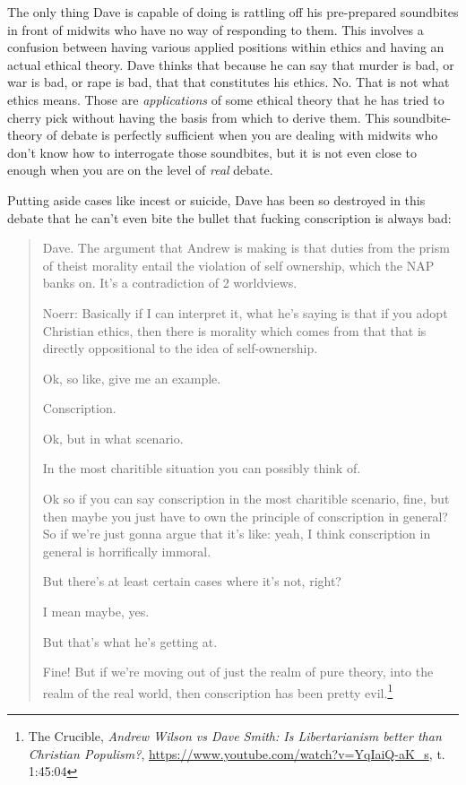 \documentclass[11pt]{article}
\begin{document}
The only thing Dave is capable of doing is rattling off his pre-prepared soundbites in front of midwits who have no way of responding to them. This involves a confusion between having various applied positions within ethics and having an actual ethical theory. Dave thinks that because he can say that murder is bad, or war is bad, or rape is bad, that that constitutes his ethics. No. That is not what ethics means. Those are \emph{applications} of some ethical theory that he has tried to cherry pick without having the basis from which to derive them. This soundbite-theory of debate is perfectly sufficient when you are dealing with midwits who don't know how to interrogate those soundbites, but it is not even close to enough when you are on the level of \emph{real} debate.

Putting aside cases like incest or suicide, Dave has been so destroyed in this debate that he can't even bite the bullet that fucking conscription is always bad:
\begin{quote}
Dave. The argument that Andrew is making is that duties from the prism of theist morality entail the violation of self ownership, which the NAP banks on. It's a contradiction of 2 worldviews.

Noerr: Basically if I can interpret it, what he's saying is that if you adopt Christian ethics, then there is morality which comes from that that is directly oppositional to the idea of self-ownership.

Ok, so like, give me an example.

Conscription.

Ok, but in what scenario.

In the most charitible situation you can possibly think of.

Ok so if you can say conscription in the most charitible scenario, fine, but then maybe you just have to own the principle of conscription in general? So if we're just gonna argue that it's like: yeah, I think conscription in general is horrifically immoral.

But there's at least certain cases where it's not, right?

I mean maybe, yes.

But that's what he's getting at.

Fine! But if we're moving out of just the realm of pure theory, into the realm of the real world, then conscription has been pretty evil.\footnote{The Crucible, \emph{Andrew Wilson vs Dave Smith: Is Libertarianism better than Christian Populism?}, \url{https://www.youtube.com/watch?v=YqIaiQ-aK\_s}, t. 1:45:04}
\end{quote}
\end{document}
